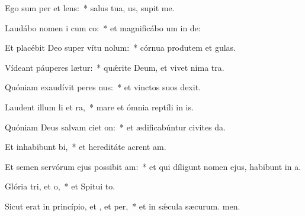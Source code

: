 \item Ego sum per et lens:~* salus tua, us, supit me.
\item Laudábo nomen i cum co:~* et magnificábo um in de:
\item Et placébit Deo super vítu nolum:~* córnua produtem et gulas.
\item Vídeant páuperes  lætur:~* quǽrite Deum, et vivet nima tra.
\item Quóniam exaudívit peres nus:~* et vinctos suos  dexit.
\item Laudent illum li et ra,~* mare et ómnia reptíli in is.
\item Quóniam Deus salvam ciet on:~* et ædificabúntur civites da.
\item Et inhabibunt bi,~* et hereditáte acrent am.
\item Et semen servórum ejus possibit am:~* et qui díligunt nomen ejus, habibunt in a.
\item Glória tri, et o,~* et Spitui to.
\item Sicut erat in princípio, et , et per,~* et in sǽcula sæcurum. men.
